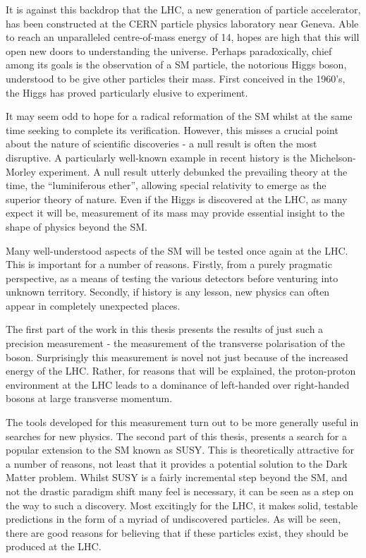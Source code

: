 It is against this backdrop that the \ac{LHC}, a new generation of particle
accelerator, has been constructed at the \ac{CERN} particle physics laboratory
near Geneva. Able to reach an unparalleled centre-of-mass energy of
\unit{14}{\TeV}, hopes are high that this will open new doors to understanding
the universe. Perhaps paradoxically, chief among its goals is the observation of
a \ac{SM} particle, the notorious Higgs boson, understood to be give other
particles their mass. First conceived in the 1960's, the Higgs has proved
particularly elusive to experiment.

It may seem odd to hope for a radical reformation of the \ac{SM} whilst at the
same time seeking to complete its verification. However, this misses a crucial
point about the nature of scientific discoveries - a null result is often the
most disruptive. A particularly well-known example in recent history is the
Michelson-Morley experiment. A null result utterly debunked the prevailing
theory at the time, the ``luminiferous ether'', allowing special relativity to
emerge as the superior theory of nature. Even if the Higgs is discovered at the
\ac{LHC}, as many expect it will be, measurement of its mass may provide
essential insight to the shape of physics beyond the \ac{SM}.

Many well-understood aspects of the \ac{SM} will be tested once again at the
\ac{LHC}. This is important for a number of reasons. Firstly, from a purely
pragmatic perspective, as a means of testing the various detectors before
venturing into unknown territory. Secondly, if history is any lesson, new
physics can often appear in completely unexpected places.

The first part of the work in this thesis presents the results of just such a
precision measurement - the measurement of the transverse polarisation of the
\PW boson. Surprisingly this measurement is novel not just because of the
increased energy of the \ac{LHC}. Rather, for reasons that will be explained,
the proton-proton environment at the \ac{LHC} leads to a dominance of
left-handed over right-handed \PW bosons at large transverse momentum.

The tools developed for this measurement turn out to be more generally useful in
searches for new physics. The second part of this thesis, presents a search for
a popular extension to the \ac{SM} known as \acl{SUSY}. This is theoretically
attractive for a number of reasons, not least that it provides a potential
solution to the Dark Matter problem. Whilst \ac{SUSY} is a fairly incremental
step beyond the \ac{SM}, and not the drastic paradigm shift many feel is
necessary, it can be seen as a step on the way to such a discovery. Most
excitingly for the \ac{LHC}, it makes solid, testable predictions in the form of
a myriad of undiscovered particles. As will be seen, there are good reasons for
believing that if these particles exist, they should be produced at the
\ac{LHC}.

